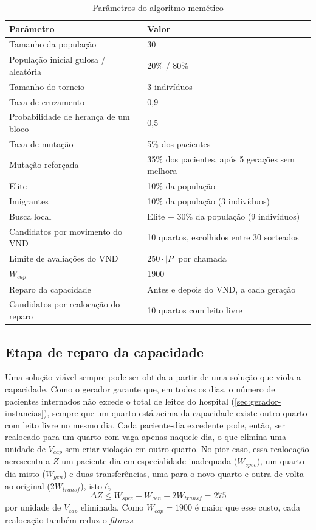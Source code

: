 \begin{table}[htbp]
    \centering
    \caption{Parâmetros do algoritmo memético}
    \label{tab:parametros-memetico}
    \begin{tabular}{ll}
        \hline
        \textbf{Parâmetro} & \textbf{Valor} \\
        \hline
        Tamanho da população & 30 \\
        População inicial gulosa / aleatória & 20\% / 80\% \\
        Tamanho do torneio & 3 indivíduos \\
        Taxa de cruzamento & 0,9 \\
        Probabilidade de herança de um bloco & 0,5 \\
        Taxa de mutação & 5\% dos pacientes \\
        Mutação reforçada & 35\% dos pacientes, após 5 gerações sem melhora \\
        Elite & 10\% da população \\
        Imigrantes & 10\% da população (3 indivíduos) \\
        Busca local & Elite + 30\% da população (9 indivíduos) \\
        Candidatos por movimento do VND & 10 quartos, escolhidos entre 30 sorteados \\
        Limite de avaliações do VND & $250 \cdot |P|$ por chamada \\
        $W_{cap}$ & 1900 \\
        Reparo da capacidade & Antes e depois do VND, a cada geração \\
        Candidatos por realocação do reparo & 10 quartos com leito livre \\
        \hline
    \end{tabular}
\end{table}

\subsection{Etapa de reparo da capacidade}
\label{sec:reparo}

Uma solução viável sempre pode ser obtida a partir de uma solução que viola a capacidade. Como o gerador garante que, em todos os dias, o número de pacientes internados não excede o total de leitos do hospital (\autoref{sec:gerador-instancias}), sempre que um quarto está acima da capacidade existe outro quarto com leito livre no mesmo dia. Cada paciente-dia excedente pode, então, ser realocado para um quarto com vaga apenas naquele dia, o que elimina uma unidade de $V_{cap}$ sem criar violação em outro quarto. No pior caso, essa realocação acrescenta a $Z$ um paciente-dia em especialidade inadequada ($W_{spec}$), um quarto-dia misto ($W_{gen}$) e duas transferências, uma para o novo quarto e outra de volta ao original ($2W_{transf}$), isto é,
\begin{equation}
    \Delta Z \leq W_{spec} + W_{gen} + 2W_{transf} = 275
    \label{eq:custo-reparo}
\end{equation}
por unidade de $V_{cap}$ eliminada. Como $W_{cap} = 1900$ é maior que esse custo, cada realocação também reduz o \textit{fitness}.


